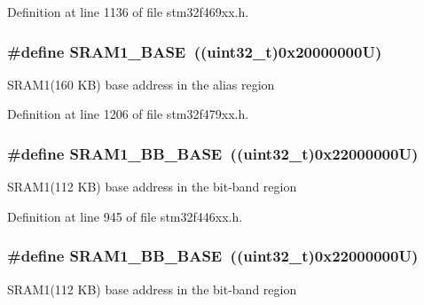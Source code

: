 Definition at line 1136 of file stm32f469xx.\+h.

\subsubsection[{\texorpdfstring{S\+R\+A\+M1\+\_\+\+B\+A\+SE}{SRAM1_BASE}}]{\setlength{\rightskip}{0pt plus 5cm}\#define S\+R\+A\+M1\+\_\+\+B\+A\+SE~((uint32\+\_\+t)0x20000000\+U)}\hypertarget{group___peripheral__memory__map_ga7d0fbfb8894012dbbb96754b95e562cd}{}\label{group___peripheral__memory__map_ga7d0fbfb8894012dbbb96754b95e562cd}
S\+R\+A\+M1(160 K\+B) base address in the alias region 

Definition at line 1206 of file stm32f479xx.\+h.

\subsubsection[{\texorpdfstring{S\+R\+A\+M1\+\_\+\+B\+B\+\_\+\+B\+A\+SE}{SRAM1_BB_BASE}}]{\setlength{\rightskip}{0pt plus 5cm}\#define S\+R\+A\+M1\+\_\+\+B\+B\+\_\+\+B\+A\+SE~((uint32\+\_\+t)0x22000000\+U)}\hypertarget{group___peripheral__memory__map_gac4c4f61082e4b168f29d9cf97dc3ca5c}{}\label{group___peripheral__memory__map_gac4c4f61082e4b168f29d9cf97dc3ca5c}
S\+R\+A\+M1(112 K\+B) base address in the bit-\/band region 

Definition at line 945 of file stm32f446xx.\+h.

\subsubsection[{\texorpdfstring{S\+R\+A\+M1\+\_\+\+B\+B\+\_\+\+B\+A\+SE}{SRAM1_BB_BASE}}]{\setlength{\rightskip}{0pt plus 5cm}\#define S\+R\+A\+M1\+\_\+\+B\+B\+\_\+\+B\+A\+SE~((uint32\+\_\+t)0x22000000\+U)}\hypertarget{group___peripheral__memory__map_gac4c4f61082e4b168f29d9cf97dc3ca5c}{}\label{group___peripheral__memory__map_gac4c4f61082e4b168f29d9cf97dc3ca5c}
S\+R\+A\+M1(112 K\+B) base address in the bit-\/band region 

